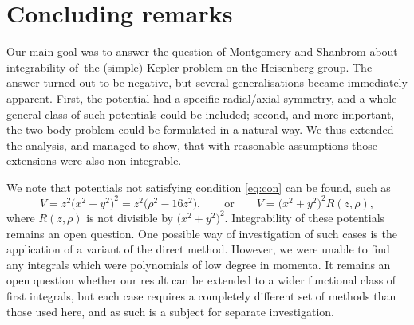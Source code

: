 \section{Concluding remarks}

Our main goal was to answer the question of Montgomery and Shanbrom about integrability of~the (simple) Kepler problem on the Heisenberg group. The answer turned out to be negative, but several generalisations became immediately apparent. First, the potential had a specific radial/axial symmetry, and a whole general class of such potentials could be included; second, and more important, the two-body problem could be formulated in a natural way. We thus extended the analysis, and managed to show, that with reasonable assumptions those extensions were also non-integrable.

We note that potentials not satisfying condition \eqref{eq:con} can be found, such as
\begin{equation*}
 V = z^2\big(x^2+y^2\big)^2 = z^2\big(\rho^2-16z^2\big), \qquad\text{or}\qquad V=\big(x^2+y^2\big)^2R(z,\rho),
\end{equation*}
where $R(z,\rho)$ is not divisible by $\big(x^2+y^2\big)^2$. Integrability of these potentials remains an open question.
One possible way of investigation of such cases is the application of a variant of the direct method. However, we were unable to find any integrals which were polynomials of low degree in momenta. It remains an open question whether our result can be extended to a wider functional class of first integrals, but each case requires a completely different set of methods than those used here, and as such is a subject for separate investigation.
